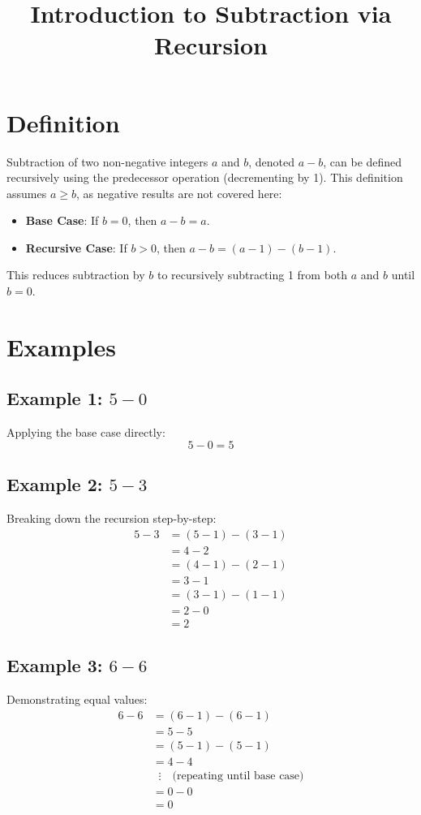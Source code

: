 \documentclass{article}
\title{Introduction to Subtraction via Recursion}
\author{}
\date{}
\begin{document}
\maketitle

\section{Definition}
Subtraction of two non-negative integers \( a \) and \( b \), denoted \( a - b \), can be defined recursively using the predecessor operation (decrementing by 1). This definition assumes \( a \geq b \), as negative results are not covered here:

\begin{itemize}
    \item \textbf{Base Case}: If \( b = 0 \), then \( a - b = a \).
    \item \textbf{Recursive Case}: If \( b > 0 \), then \( a - b = (a - 1) - (b - 1) \).
\end{itemize}

This reduces subtraction by \( b \) to recursively subtracting 1 from both \( a \) and \( b \) until \( b = 0 \).

\section{Examples}

\subsection{Example 1: \( 5 - 0 \)}
Applying the base case directly:
\[
5 - 0 = 5
\]

\subsection{Example 2: \( 5 - 3 \)}
Breaking down the recursion step-by-step:
\[
\begin{aligned}
5 - 3 &= (5 - 1) - (3 - 1) \\
&= 4 - 2 \\
&= (4 - 1) - (2 - 1) \\
&= 3 - 1 \\
&= (3 - 1) - (1 - 1) \\
&= 2 - 0 \\
&= 2
\end{aligned}
\]

\subsection{Example 3: \( 6 - 6 \)}
Demonstrating equal values:
\[
\begin{aligned}
6 - 6 &= (6 - 1) - (6 - 1) \\
&= 5 - 5 \\
&= (5 - 1) - (5 - 1) \\
&= 4 - 4 \\
&\;\;\vdots \quad \text{(repeating until base case)} \\
&= 0 - 0 \\
&= 0
\end{aligned}
\]
\end{document}
